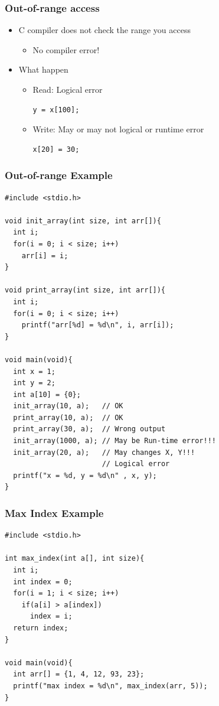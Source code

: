 \documentclass{../c-lecture}
\begin{document}
\begin{frame}[fragile]
  \frametitle{Out-of-range access}
  \begin{itemize}
    \item C compiler does not check the range you access
    \begin{itemize}
      \begin{verbatim}
int x[10]; x[20] = 30; y = x[100];
      \end{verbatim}
      \item No compiler error!
    \end{itemize}
    \item What happen
    \begin{itemize}
      \item Read: Logical error
      \begin{verbatim}
y = x[100];
      \end{verbatim}
      \item Write: May or may not logical or runtime error
      \begin{verbatim}
x[20] = 30;
      \end{verbatim}
    \end{itemize}
  \end{itemize}
\end{frame}

\begin{frame}
  \frametitle{Out-of-range Example}
  \begin{verbatim}
#include <stdio.h>

void init_array(int size, int arr[]){
  int i;
  for(i = 0; i < size; i++)
    arr[i] = i;
}

void print_array(int size, int arr[]){
  int i;
  for(i = 0; i < size; i++)
    printf("arr[%d] = %d\n", i, arr[i]);
}

void main(void){
  int x = 1;
  int y = 2;
  int a[10] = {0};
  init_array(10, a);   // OK
  print_array(10, a);  // OK
  print_array(30, a);  // Wrong output
  init_array(1000, a); // May be Run-time error!!!
  init_array(20, a);   // May changes X, Y!!!
                       // Logical error
  printf("x = %d, y = %d\n" , x, y);
}
  \end{verbatim}
\end{frame}

\begin{frame}[fragile]
  \frametitle{Max Index Example}
  \begin{verbatim}
#include <stdio.h>

int max_index(int a[], int size){
  int i;
  int index = 0;
  for(i = 1; i < size; i++)
    if(a[i] > a[index])
      index = i;
  return index;
}

void main(void){
  int arr[] = {1, 4, 12, 93, 23};
  printf("max index = %d\n", max_index(arr, 5));
}
  \end{verbatim}
\end{frame}
\end{document}

